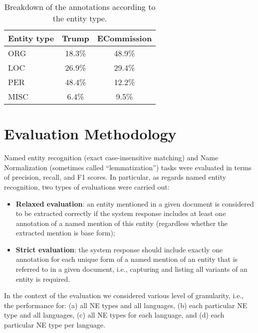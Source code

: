 \documentclass[11pt]{article}
\begin{document}
\begin{table}
\begin{center}
\begin{footnotesize}
\begin{tabular}{lcc}
\toprule 
 Entity type & {\textbf{{\sc Trump}}} & {\textbf{{\sc ECommission}}} \\
\midrule
ORG & 18.3\% & 48.9\% \\
LOC & 26.9\% & 29.4\% \\
PER & 48.4\% & 12.2\% \\
MISC & 6.4\% & 9.5\% \\
\bottomrule
\end{tabular}
\end{footnotesize}
\end{center}
\caption{Breakdown of the annotations according to the entity type.}
\label{tab:datasets-2}
\end{table}

\section{Evaluation Methodology}
\label{sec:evaluation}

Named entity recognition (exact case-insensitive matching) and  Name Normalization (sometimes called “lemmatization”) tasks were evaluated in terms of precision, recall, and F1 scores. In particular, as regards named entity recognition, two types of evaluations were carried out:

\begin{itemize}

\item \textbf{Relaxed evaluation}: an entity mentioned in a given document is considered to be extracted correctly if the system response includes at least one annotation of a named mention of this entity (regardless whether the extracted mention is base form);

\item \textbf{Strict evaluation}: the system response should include exactly one annotation for each unique form of a named mention of an entity that is referred to in a given document, i.e., capturing and listing all variants of an entity is required.

\end{itemize}

In the context of the evaluation we considered various level of granularity, i.e., the performance for: 
(a) all NE types and all languages, (b) each particular NE type and all languages, (c) all NE types for 
each language, and (d) each particular NE type per language. 
\end{document}
